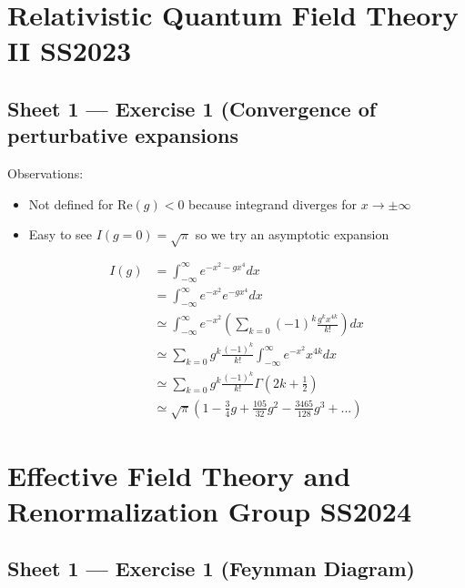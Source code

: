 \documentclass[10pt,a4paper]{report}
\theoremstyle{definition}
\begin{document}
\chapter{\color{blue} Relativistic Quantum Field Theory II SS2023}
\section{\color{blue} Sheet 1 — Exercise 1 (Convergence of perturbative expansions}
Observations:
\begin{itemize}
\item Not defined for $\text{Re}(g)<0$ because integrand diverges for $x\rightarrow \pm\infty$ 
\item Easy to see $I(g=0)=\sqrt{\pi}$ so we try an asymptotic expansion
\end{itemize}
\begin{align}
I(g)
&=\int_{-\infty}^\infty e^{-x^2-gx^4}dx\\
&=\int_{-\infty}^\infty e^{-x^2}e^{-gx^4}dx\\
&\simeq\int_{-\infty}^\infty e^{-x^2}\left(\sum_{k=0}(-1)^k\frac{g^kx^{4k}}{k!}\right)dx\\
&\simeq\sum_{k=0}g^k\frac{(-1)^k}{k!}\int_{-\infty}^\infty e^{-x^2}x^{4k}dx\\
&\simeq\sum_{k=0}g^k\frac{(-1)^k}{k!}\Gamma\left(2k+\frac{1}{2}\right)\\
&\simeq\sqrt{\pi}\left(1-\frac{3}{4}g+\frac{105}{32}g^2-\frac{3465}{128}g^3+...\right)
\end{align}

\newpage

\chapter{\color{green} Eﬀective Field Theory and Renormalization Group SS2024}
\section{\color{green} Sheet 1 — Exercise 1 (Feynman Diagram)}
\end{document}

